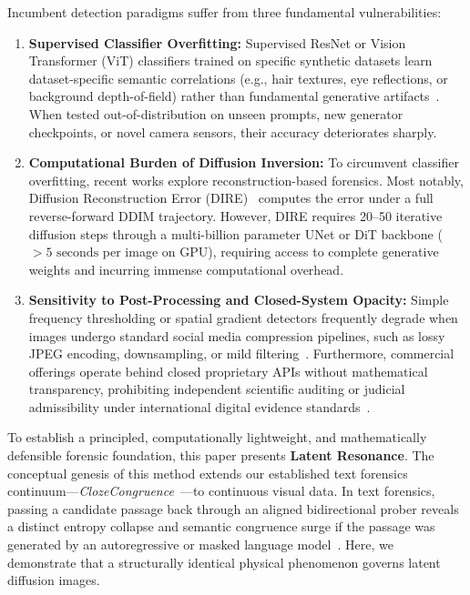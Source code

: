 \documentclass{article}
\theoremstyle{definition}
\begin{document}
Incumbent detection paradigms suffer from three fundamental vulnerabilities:
\begin{enumerate}
    \item \textbf{Supervised Classifier Overfitting:} Supervised ResNet or Vision Transformer (ViT) classifiers trained on specific synthetic datasets learn dataset-specific semantic correlations (e.g., hair textures, eye reflections, or background depth-of-field) rather than fundamental generative artifacts~\citep{wang2020cnn,ojha2023towards}. When tested out-of-distribution on unseen prompts, new generator checkpoints, or novel camera sensors, their accuracy deteriorates sharply.
    \item \textbf{Computational Burden of Diffusion Inversion:} To circumvent classifier overfitting, recent works explore reconstruction-based forensics. Most notably, Diffusion Reconstruction Error (DIRE)~\citep{wang2023dire} computes the error under a full reverse-forward DDIM trajectory. However, DIRE requires 20--50 iterative diffusion steps through a multi-billion parameter UNet or DiT backbone ($>5\text{ seconds}$ per image on GPU), requiring access to complete generative weights and incurring immense computational overhead.
    \item \textbf{Sensitivity to Post-Processing and Closed-System Opacity:} Simple frequency thresholding or spatial gradient detectors frequently degrade when images undergo standard social media compression pipelines, such as lossy JPEG encoding, downsampling, or mild filtering~\citep{corvi2023detection}. Furthermore, commercial offerings operate behind closed proprietary APIs without mathematical transparency, prohibiting independent scientific auditing or judicial admissibility under international digital evidence standards~\citep{iso27037}.
\end{enumerate}

To establish a principled, computationally lightweight, and mathematically defensible forensic foundation, this paper presents \textbf{Latent Resonance}. The conceptual genesis of this method extends our established text forensics continuum---\textit{ClozeCongruence}~\citep{bandyopadhyay2026cloze1,bandyopadhyay2026dna,bandyopadhyay2026scaling,bandyopadhyay2026cloze3}---to continuous visual data. In text forensics, passing a candidate passage back through an aligned bidirectional prober reveals a distinct entropy collapse and semantic congruence surge if the passage was generated by an autoregressive or masked language model~\citep{bandyopadhyay2026cloze1}. Here, we demonstrate that a structurally identical physical phenomenon governs latent diffusion images.
\end{document}
